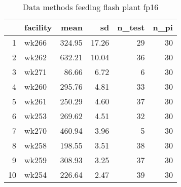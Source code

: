 \begin{table}[H]
\centering
\begin{tabular}{rlrrrr}
  \hline
 & facility & mean & sd & n\_test & n\_pi \\ 
  \hline
1 & wk266 & 324.95 & 17.26 &  29 &  30 \\ 
  2 & wk262 & 632.21 & 10.04 &  36 &  30 \\ 
  3 & wk271 & 86.66 & 6.72 &   6 &  30 \\ 
  4 & wk260 & 295.76 & 4.81 &  33 &  30 \\ 
  5 & wk261 & 250.29 & 4.60 &  37 &  30 \\ 
  6 & wk253 & 269.62 & 4.51 &  32 &  30 \\ 
  7 & wk270 & 460.94 & 3.96 &   5 &  30 \\ 
  8 & wk258 & 198.55 & 3.51 &  38 &  30 \\ 
  9 & wk259 & 308.93 & 3.25 &  37 &  30 \\ 
  10 & wk254 & 226.64 & 2.47 &  39 &  30 \\ 
   \hline
\end{tabular}
\caption{Data methods feeding flash plant fp16} 
\label{tab:well_summaries_fp16}
\end{table}
